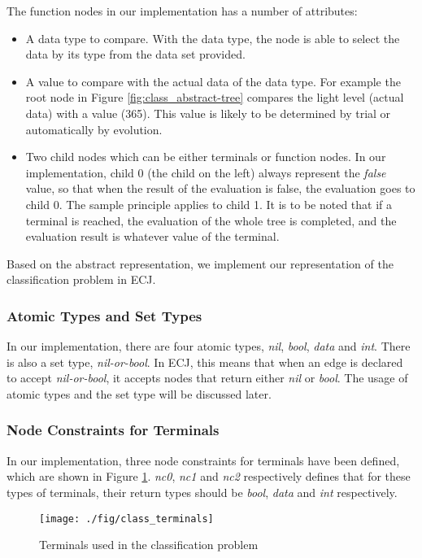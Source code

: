 The function nodes in our implementation has a number of attributes:
\begin{itemize}
	\item A data type to compare. With the data type, the node is able to select the data by its type from the data set provided.
	\item A value to compare with the actual data of the data type. For example the root node in Figure \ref{fig:class_abstract-tree} compares the light level (actual data) with a value (365). This value is likely to be determined by trial or automatically by evolution.
	\item Two child nodes which can be either terminals or function nodes. In our implementation, child 0 (the child on the left) always represent the \emph{false} value, so that when the result of the evaluation is false, the evaluation goes to child 0. The sample principle applies to child 1. It is to be noted that if a terminal is reached, the evaluation of the whole tree is completed, and the evaluation result is whatever value of the terminal.
\end{itemize}

Based on the abstract representation, we implement our representation of the classification problem in ECJ. 

\subsubsection{Atomic Types and Set Types}
In our implementation, there are four atomic types, \emph{nil}, \emph{bool}, \emph{data} and \emph{int}. There is also a set type, \emph{nil-or-bool}. In ECJ, this means that when an edge is declared to accept \emph{nil-or-bool}, it accepts nodes that return either \emph{nil} or \emph{bool}. The usage of atomic types and the set type will be discussed later.

\subsubsection{Node Constraints for Terminals}
In our implementation, three node constraints for terminals have been defined, which are shown in Figure \ref{fig:class-terminals}. \emph{nc0}, \emph{nc1} and \emph{nc2} respectively defines that for these types of terminals, their return types should be \emph{bool}, \emph{data} and \emph{int} respectively.

\begin{figure}[ht!]
	\centering
	\texttt{[image: ./fig/class\_terminals]}
	\caption{Terminals used in the classification problem}
	\label{fig:class-terminals}
\end{figure}


